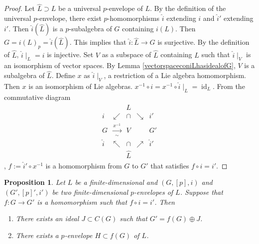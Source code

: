 \documentclass[12pt,MSc]{muthesis_2023}
\theoremstyle{plain}%
\newtheorem{Proposition}[FactCounter]{Proposition} %
\theoremstyle{definition}
\theoremstyle{remark}
\DeclareMathOperator{\id}{id}
\begin{document}
\begin{proof}
Let $\widehat{L} \supset L$ be a universal $p$-envelope of $L$. By the definition of the universal $p$-envelope, there exist $p$-homomorphisms $\widehat{i}$ extending $i$ and $\widehat{i}'$ extending $i'$. Then $\widehat{i}(\widehat{L})$ is a $p$-subalgebra of $G$ containing $i(L)$. Then $G={i(L)}_p=\widehat{i}(\widehat{L})$. This implies that $\widehat{i}:\widehat{L}\rightarrow G$ is surjective. By the definition of $\widehat{L}$, $\widehat{i} \mid_L=i$ is injective. Set $V$ as a subspace of $\widehat{L}$ containing $L$ such that $\widehat{i}\mid_V$ is an isomorphism of vector spaces. By Lemma \ref{vectorspaceconiLhasidealofG}, $V$ is a subalgebra of $\widehat{L}$. Define $x$ as $\widehat{i}\mid_V$, a restriction of a Lie algebra homomorphism. Then $x$ is an isomorphism of Lie algebras. $x^{-1}\circ i=x^{-1}\circ\widehat{i} \mid_L=\id_L$. From the commutative diagram
\begin{align*}
\begin{matrix}
 & & L & & \\
 i&\swarrow&\cap &\searrow&i'\\
G &\xrightarrow[\sim]{x^{-1}}&V&&G'\\
 \widehat{i}&\nwarrow&\cap&\nearrow&\widehat{i}'\\
 &&\widehat{L}&&
\end{matrix}
\end{align*}, $f:= \widehat{i}'\circ x^{-1}$ is a homomorphism from $G$ to $G'$ that satisfies $f\circ i=i'$.
\end{proof}

\begin{Proposition}\label{existpenvelope}
Let $L$ be a finite-dimensional and $(G, [p], i)$ and $(G', [p]', i')$ be two finite-dimensional $p$-envelopes of $L$. Suppose that $f:G \rightarrow G'$ is a homomorphism such that $f\circ i=i'$. Then
\begin{enumerate}
\item[(1)]
There exists an ideal $J\subset C(G)$ such that $G'=f(G)\oplus J$.

\item[(2)]
There exists a $p$-envelope $H\subset f(G)$ of $L$.
\end{enumerate}
\end{Proposition}
\end{document}
